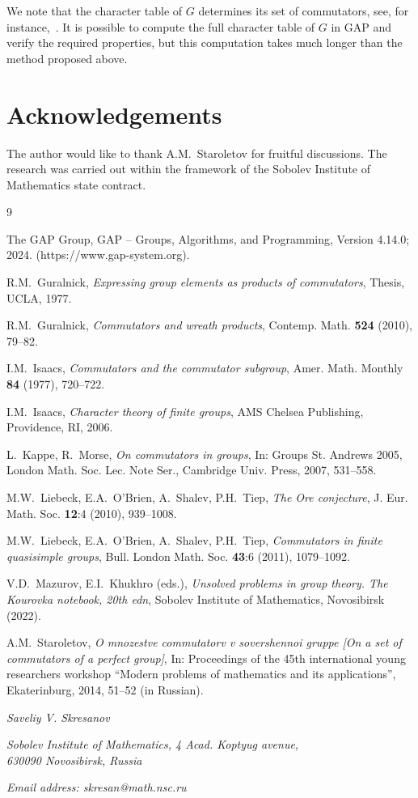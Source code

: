 \documentclass{article}
\begin{document}
We note that the character table of \( G \) determines its set of commutators, see, for instance,~\cite[Problem~3.10]{char}.
It is possible to compute the full character table of \( G \) in GAP and verify the required properties, but this computation
takes much longer than the method proposed above.

\section{Acknowledgements}

The author would like to thank A.M.~Staroletov for fruitful discussions.
The research was carried out within the framework of the Sobolev Institute of Mathematics state contract.

\begin{thebibliography}{9}

	The GAP Group, GAP -- Groups, Algorithms, and Programming, Version 4.14.0; 2024. (https://www.gap-system.org).

	R.M.~Guralnick,
	\emph{Expressing group elements as products of commutators},
	Thesis, UCLA, 1977.

	R.M.~Guralnick,
	\emph{Commutators and wreath products},
	Contemp. Math. \textbf{524} (2010), 79--82.

	I.M.~Isaacs,
	\emph{Commutators and the commutator subgroup},
	Amer. Math. Monthly \textbf{84} (1977), 720--722.

	I.M.~Isaacs,
	\emph{Character theory of finite groups},
	AMS Chelsea Publishing, Providence, RI, 2006.

	L.~Kappe, R.~Morse,
	\emph{On commutators in groups},
	In: Groups St. Andrews 2005, London Math. Soc. Lec. Note Ser., Cambridge Univ. Press, 2007, 531--558.

	M.W.~Liebeck, E.A.~O'Brien, A.~Shalev, P.H.~Tiep,
	\emph{The Ore conjecture},
	J. Eur. Math. Soc. \textbf{12}:4 (2010), 939--1008.

	M.W.~Liebeck, E.A.~O'Brien, A.~Shalev, P.H.~Tiep,
	\emph{Commutators in finite quasisimple groups},
	Bull. London Math. Soc. \textbf{43}:6 (2011), 1079--1092.

	V.D.~Mazurov, E.I.~Khukhro (eds.), \emph{Unsolved problems in group theory. The Kourovka notebook, 20th edn},
	Sobolev Institute of Mathematics, Novosibirsk (2022).

	A.M.~Staroletov,
	\emph{O mnozestve commutatorv v sovershennoi gruppe [On a set of commutators of a perfect group]},
	In: Proceedings of the 45th international young researchers workshop ``Modern problems of mathematics and its applications'',
	Ekaterinburg, 2014, 51--52 (in Russian).

\end{thebibliography}
\bigskip

\noindent
\emph{Saveliy V. Skresanov}

\noindent
\emph{Sobolev Institute of Mathematics, 4 Acad. Koptyug avenue,\\ 630090 Novosibirsk, Russia}

\noindent
\emph{Email address: skresan@math.nsc.ru}
\end{document}
